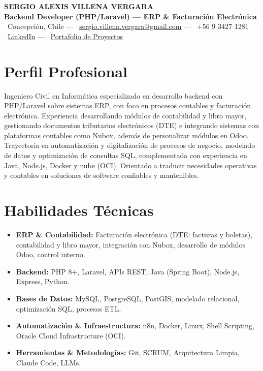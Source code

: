 \documentclass[10pt,a4paper]{article}
\begin{document}
\begin{center}
  {\fontsize{24}{28}\selectfont\bfseries SERGIO ALEXIS VILLENA VERGARA}\\[3pt]
  {\Large\bfseries\color{azul} Backend Developer (PHP/Laravel) --- ERP \& Facturación Electrónica}\\[4pt]
  \small
  \faMapMarker*\ Concepción, Chile \quad --- \quad
  \faEnvelope\ \href{mailto:sergio.villena.vergara@gmail.com}{\color{azul}sergio.villena.vergara@gmail.com} \quad --- \quad
  \faPhone\ +56 9 3427 1281\\
  \faLinkedin\ \href{https://www.linkedin.com/in/sergio-villena-vergara}{\color{azul}LinkedIn} \quad --- \quad
  \faGlobe\ \href{https://sergiovillena.vercel.app/}{\color{azul}Portafolio de Proyectos}
\end{center}

\section{Perfil Profesional}
Ingeniero Civil en Informática especializado en desarrollo backend con PHP/Laravel sobre sistemas ERP, con foco en procesos contables y facturación electrónica. Experiencia desarrollando módulos de contabilidad y libro mayor, gestionando documentos tributarios electrónicos (DTE) e integrando sistemas con plataformas contables como Nubox, además de personalizar módulos en Odoo. Trayectoria en automatización y digitalización de procesos de negocio, modelado de datos y optimización de consultas SQL, complementada con experiencia en Java, Node.js, Docker y nube (OCI). Orientado a traducir necesidades operativas y contables en soluciones de software confiables y mantenibles.

\section{Habilidades Técnicas}
\begin{itemize}
  \item \textbf{ERP \& Contabilidad:} Facturación electrónica (DTE: facturas y boletas), contabilidad y libro mayor, integración con Nubox, desarrollo de módulos Odoo, control interno.
  \item \textbf{Backend:} PHP 8+, Laravel, APIs REST, Java (Spring Boot), Node.js, Express, Python.
  \item \textbf{Bases de Datos:} MySQL, PostgreSQL, PostGIS, modelado relacional, optimización SQL, procesos ETL.
  \item \textbf{Automatización \& Infraestructura:} n8n, Docker, Linux, Shell Scripting, Oracle Cloud Infrastructure (OCI).
  \item \textbf{Herramientas \& Metodologías:} Git, SCRUM, Arquitectura Limpia, Claude Code, LLMs.
\end{itemize}
\end{document}
